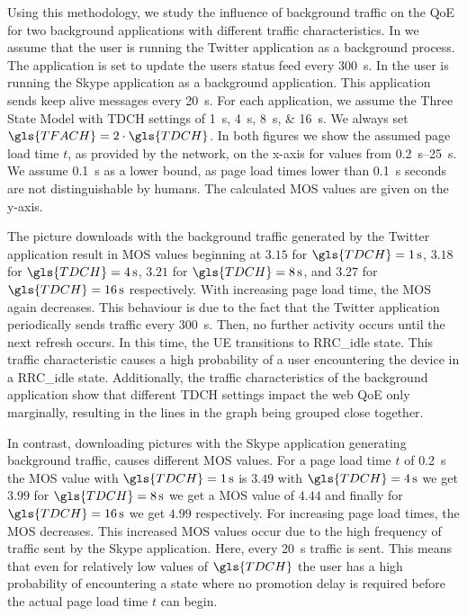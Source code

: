 Using this methodology, we study the influence of background traffic on the \gls{QoE} for two background applications with different traffic characteristics.
In  we assume that the user is running the Twitter application as a background process.
The application is set to update the users status feed every \SI{300}{\second}.
In  the user is running the Skype application as a background application.
This application sends keep alive messages every \SI{20}{\second}.
For each application, we assume the Three State Model with \gls{TDCH} settings of \SIlist{1;4;8;16}{\second}.
We always set \(\gls{TFACH} = 2\cdot \gls{TDCH}\).
In both figures we show the assumed page load time \(t\), as provided by the network, on the x-axis for values from \SIrange{0.2}{25}{\second}.
We assume \SI{0.1}{\second} as a lower bound, as page load times lower than \SI{0.1}{\second} seconds are not distinguishable \cite{egger2012b} by humans.
The calculated \gls{MOS} values are given on the y-axis.

The picture downloads with the background traffic generated by the Twitter application result in \gls{MOS} values beginning at \(3.15\) for \(\gls{TDCH} = \SI{1}{\second}\), \(3.18\) for \(\gls{TDCH} = \SI{4}{\second}\), \(3.21\) for \(\gls{TDCH} = \SI{8}{\second}\), and \(3.27\) for \(\gls{TDCH} = \SI{16}{\second}\) respectively.
With increasing page load time, the \gls{MOS} again decreases.
This behaviour is due to the fact that the Twitter application periodically sends traffic every \SI{300}{\second}.
Then, no further activity occurs until the next refresh occurs.
In this time, the \gls{UE} transitions to \gls{RRC_idle} state.
This traffic characteristic causes a high probability of a user encountering the device in a \gls{RRC_idle} state.
Additionally, the traffic characteristics of the background application show that different \gls{TDCH} settings impact the web \gls{QoE} only marginally, resulting in the lines in the graph being grouped close together.

In contrast, downloading pictures with the Skype application generating background traffic, causes different \gls{MOS} values.
For a page load time \(t\) of \SI{0.2}{\second} the \gls{MOS} value with \(\gls{TDCH} = \SI{1}{\second}\) is \(3.49\) with \(\gls{TDCH} = \SI{4}{\second}\) we get \(3.99\) for \(\gls{TDCH} = \SI{8}{\second}\) we get a \gls{MOS} value of \(4.44\) and finally for \(\gls{TDCH} = \SI{16}{\second}\) we get \(4.99\) respectively.
For increasing page load times, the \gls{MOS} decreases.
This increased \gls{MOS} values occur due to the high frequency of traffic sent by the Skype application.
Here, every \SI{20}{\second} traffic is sent.
This means that even for relatively low values of \(\gls{TDCH}\) the user has a high probability of encountering a state where no promotion delay is required before the actual page load time \(t\) can begin.

